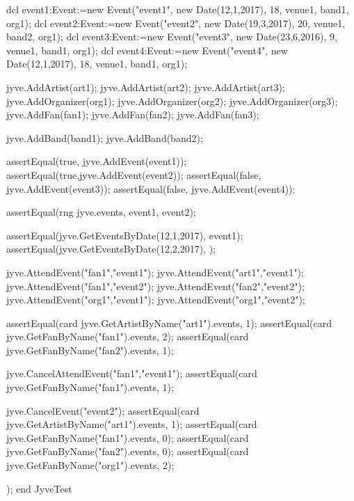\begin{vdmpp}[breaklines=true]
  dcl event1:Event:=new Event("event1", new Date(12,1,2017), 18, venue1, band1, org1);
  dcl event2:Event:=new Event("event2", new Date(19,3,2017), 20, venue1, band2, org1);
  dcl event3:Event:=new Event("event3", new Date(23,6,2016), 9, venue1, band1, org1);
  dcl event4:Event:=new Event("event4", new Date(12,1,2017), 18, venue1, band1, org1);
  
  jyve.AddArtist(art1);
  jyve.AddArtist(art2);
  jyve.AddArtist(art3);
  jyve.AddOrganizer(org1);
  jyve.AddOrganizer(org2);
  jyve.AddOrganizer(org3);
  jyve.AddFan(fan1);
  jyve.AddFan(fan2);
  jyve.AddFan(fan3);
  
  jyve.AddBand(band1);
  jyve.AddBand(band2);
  
  assertEqual(true, jyve.AddEvent(event1));
  assertEqual(true,jyve.AddEvent(event2));
  assertEqual(false, jyve.AddEvent(event3));
  assertEqual(false, jyve.AddEvent(event4));
  
  assertEqual(rng jyve.events, {event1, event2});
  
  assertEqual(jyve.GetEventsByDate(12,1,2017), {event1});
  assertEqual(jyve.GetEventsByDate(12,2,2017), {});
  
  jyve.AttendEvent("fan1","event1");
  jyve.AttendEvent("art1","event1");
  jyve.AttendEvent("fan1","event2");
  jyve.AttendEvent("fan2","event2");
  jyve.AttendEvent("org1","event1");
  jyve.AttendEvent("org1","event2");
  
  assertEqual(card jyve.GetArtistByName("art1").events, 1);
  assertEqual(card jyve.GetFanByName("fan1").events, 2);
  assertEqual(card jyve.GetFanByName("fan2").events, 1);
  
  jyve.CancelAttendEvent("fan1","event1");
  assertEqual(card jyve.GetFanByName("fan1").events, 1);
  
  jyve.CancelEvent("event2");
  assertEqual(card jyve.GetArtistByName("art1").events, 1);
  assertEqual(card jyve.GetFanByName("fan1").events, 0);
  assertEqual(card jyve.GetFanByName("fan2").events, 0);
  assertEqual(card jyve.GetFanByName("org1").events, 2);
  
  
 );
end JyveTest
\end{vdmpp}
